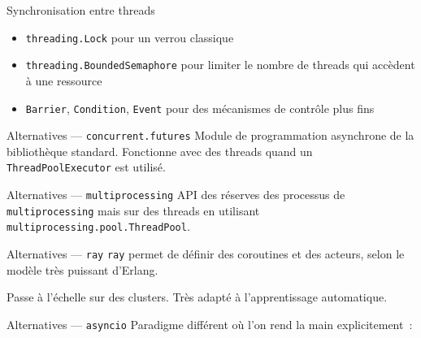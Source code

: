 \begin{frame}{Synchronisation entre threads}
  \begin{itemize}[<+->]
    \item \texttt{threading.Lock} pour un verrou classique
    \item \texttt{threading.BoundedSemaphore} pour limiter le nombre de threads qui accèdent à une ressource
    \item \texttt{Barrier}, \texttt{Condition}, \texttt{Event} pour des mécanismes de contrôle plus fins
  \end{itemize}

\end{frame}

\begin{frame}{Alternatives --- \texttt{concurrent.futures}}
  Module de programmation asynchrone de la bibliothèque standard. Fonctionne avec des threads quand un \texttt{ThreadPoolExecutor} est utilisé.
\end{frame}

\begin{frame}{Alternatives --- \texttt{multiprocessing}}
  API des réserves des processus de \texttt{multiprocessing} mais sur des threads en utilisant \texttt{multiprocessing.pool.ThreadPool}.
\end{frame}

\begin{frame}{Alternatives --- \texttt{ray}}
  \texttt{ray} permet de définir des coroutines et des acteurs, selon le modèle très puissant d'Erlang.

  Passe à l'échelle sur des clusters. Très adapté à l'apprentissage automatique.
\end{frame}

\begin{frame}{Alternatives --- \texttt{asyncio}}
  Paradigme différent où l'on rend la main explicitement~:

\end{frame}
